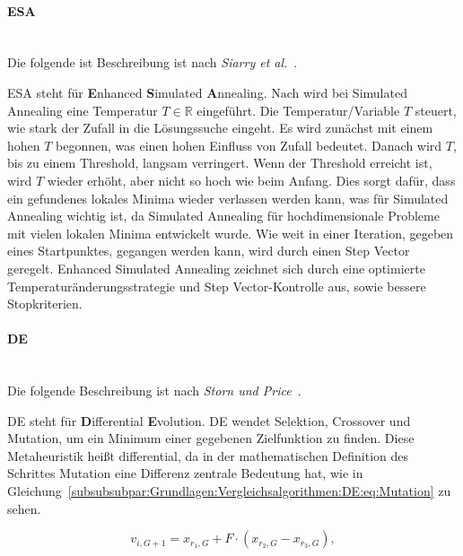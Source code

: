 \documentclass[fontsize=12, a4aper]{scrartcl}
\begin{document}
	\paragraph{ESA}\mbox{}\\
	
	Die folgende ist Beschreibung ist nach \textit{Siarry et al.}~\cite{siarry1997enhanced}.\hfill\newline
	
	ESA steht für \textbf{E}nhanced \textbf{S}imulated \textbf{A}nnealing. Nach \cite{kirkpatrick1983optimization} wird bei Simulated Annealing eine Temperatur \(T \in \mathbb{R}\) eingeführt. Die Temperatur/Variable \(T\) steuert, wie stark der Zufall in die Lösungssuche eingeht. Es wird zunächst mit einem hohen \(T\) begonnen, was einen hohen Einfluss von Zufall bedeutet. Danach wird \(T\), bis zu einem Threshold, langsam verringert. Wenn der Threshold erreicht ist, wird \(T\) wieder erhöht, aber nicht so hoch wie beim Anfang. Dies sorgt dafür, dass ein gefundenes lokales Minima wieder verlassen werden kann, was für Simulated Annealing wichtig ist, da Simulated Annealing für hochdimensionale Probleme mit vielen lokalen Minima entwickelt wurde. Wie weit in einer Iteration, gegeben eines Startpunktes, gegangen werden kann, wird durch einen Step Vector geregelt. Enhanced Simulated Annealing zeichnet sich durch eine optimierte Temperaturänderungsstrategie und Step Vector-Kontrolle aus, sowie bessere Stopkriterien.
	
	\paragraph{DE}\mbox{}\\
	
	Die folgende Beschreibung ist nach \textit{Storn und Price}~\cite{storn1997differential}.\hfill\newline
	
	DE steht für \textbf{D}ifferential \textbf{E}volution. DE wendet Selektion, Crossover und Mutation, um ein Minimum einer gegebenen Zielfunktion zu finden. Diese Metaheuristik heißt differential, da in der mathematischen Definition des Schrittes \glqq Mutation\grqq{} eine Differenz zentrale Bedeutung hat, wie in Gleichung~\ref{subsubsubpar:Grundlagen:Vergleichsalgorithmen:DE:eq:Mutation} zu sehen.
	
	\begin{equation} \label{subsubsubpar:Grundlagen:Vergleichsalgorithmen:DE:eq:Mutation}
		v_{i, G + 1} = x_{r_1, G} + F \cdot (x_{r_2, G} - x_{r_3, G}),
	\end{equation}
	
\end{document}
